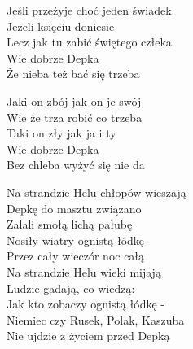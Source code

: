 \begin{text}
\begin{scriptTwelve}
    \vin Jeśli przeżyje choć jeden świadek\\
    \vin Jeżeli księciu doniesie\\
    \vin Lecz jak tu zabić świętego człeka\\
    \vin Wie dobrze Depka\\
    \vin Że nieba też bać się trzeba

    \vin Jaki on zbój jak on je swój\\
    \vin Wie że trza robić co trzeba\\
    \vin Taki on zły jak ja i ty\\
    \vin Wie dobrze Depka\\
    \vin Bez chleba wyżyć się nie da

    Na strandzie Helu chłopów wieszają\\
    Depkę do masztu związano\\
    Zalali smołą lichą pałubę\\
    Nosiły wiatry ognistą łódkę\\
    Przez cały wieczór noc całą\\
    \vin Na strandzie Helu wieki mijają\\
    \vin Ludzie gadają, co wiedzą:\\
    \vin Jak kto zobaczy ognistą łódkę -\\
    \vin Niemiec czy Rusek, Polak, Kaszuba\\
    \vin Nie ujdzie z życiem przed Depką
\end{scriptTwelve}
\end{text}
\begin{chord}

\end{chord}